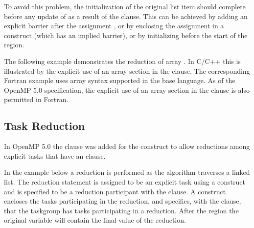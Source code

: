 To avoid this problem, the initialization of the original list item  
should complete before any update of  as a result of the  
clause. This can be achieved by adding an explicit barrier after the assignment 
, or by enclosing the assignment  in a  
construct (which has an implied barrier), or by initializing  before 
the start of the  region.



The following example demonstrates the reduction of array .  In C/C++
this is illustrated by the explicit use of an array section  in
the  clause.  The corresponding Fortran example uses array
syntax supported in the base language.  As of the OpenMP 5.0 specification, the
explicit use of an array section in the  clause is
also permitted in Fortran.




\subsection{Task Reduction}
\label{subsec:task_reduction}

In OpenMP 5.0 the  clause was added for the  construct
to allow reductions among explicit tasks that have an  clause.

In the  example below a reduction is performed as the algorithm
traverses a linked list. The reduction statement is assigned to be an explicit task using
a  construct and is specified to be a reduction participant with 
the  clause.
A  construct encloses the tasks participating in the reduction, and
specifies, with the  clause, that the taskgroup has tasks participating
in a reduction.  After the  region the original variable will contain 
the final value of the reduction.

